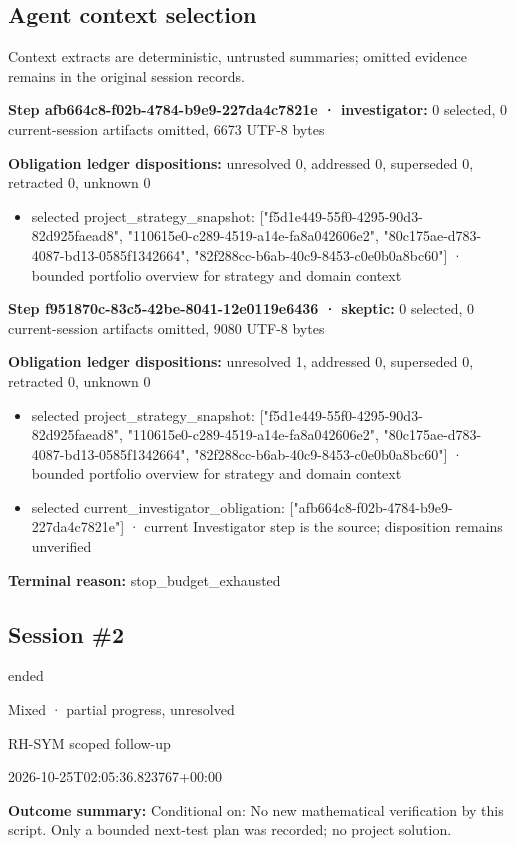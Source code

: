 \documentclass[11pt]{article}
\begin{document}
\subsection{Agent context selection}
Context extracts are deterministic, untrusted summaries; omitted evidence remains in the original session records.\par
\textbf{Step afb664c8-f02b-4784-b9e9-227da4c7821e · investigator:} 0 selected, 0 current-session artifacts omitted, 6673 UTF-8 bytes\par
\textbf{Obligation ledger dispositions:} unresolved 0, addressed 0, superseded 0, retracted 0, unknown 0\par
\begin{itemize}
\item selected project\_strategy\_snapshot: ["f5d1e449-55f0-4295-90d3-82d925faead8", "110615e0-c289-4519-a14e-fa8a042606e2", "80c175ae-d783-4087-bd13-0585f1342664", "82f288cc-b6ab-40c9-8453-c0e0b0a8bc60"] · bounded portfolio overview for strategy and domain context
\end{itemize}
\textbf{Step f951870c-83c5-42be-8041-12e0119e6436 · skeptic:} 0 selected, 0 current-session artifacts omitted, 9080 UTF-8 bytes\par
\textbf{Obligation ledger dispositions:} unresolved 1, addressed 0, superseded 0, retracted 0, unknown 0\par
\begin{itemize}
\item selected project\_strategy\_snapshot: ["f5d1e449-55f0-4295-90d3-82d925faead8", "110615e0-c289-4519-a14e-fa8a042606e2", "80c175ae-d783-4087-bd13-0585f1342664", "82f288cc-b6ab-40c9-8453-c0e0b0a8bc60"] · bounded portfolio overview for strategy and domain context
\item selected current\_investigator\_obligation: ["afb664c8-f02b-4784-b9e9-227da4c7821e"] · current Investigator step is the source; disposition remains unverified
\end{itemize}
\textbf{Terminal reason:} stop\_budget\_exhausted\par
\subsection{Session \#2}
\begin{description}[style=nextline,font=\normalfont\bfseries,leftmargin=0pt,labelsep=0pt]
\item[Execution status] ended
\item[Outcome] Mixed · partial progress, unresolved
\item[Strategy] RH-SYM scoped follow-up
\item[Started] 2026-10-25T02:05:36.823767+00:00
\end{description}
\textbf{Outcome summary:} Conditional on: No new mathematical verification by this script. Only a bounded next-test plan was recorded; no project solution.\par
\end{document}
